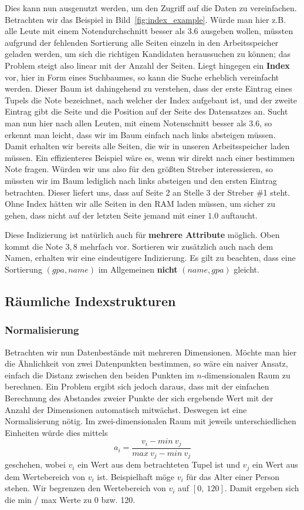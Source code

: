 Dies kann nun ausgenutzt werden, um den Zugriff auf die Daten zu vereinfachen. Betrachten
wir das Beispiel in Bild~\ref{fig:index_example}. Würde man hier z.B. alle Leute
mit einem Notendurchschnitt besser als \(3.6\) ausgeben wollen, müssten aufgrund der
fehlenden Sortierung alle Seiten einzeln in den Arbeitsspeicher geladen werden,
um sich die richtigen Kandidaten heraussuchen zu können; das Problem steigt also
linear mit der Anzahl der Seiten. Liegt hingegen ein
\textbf{Index} vor, hier in Form eines Suchbaumes, so kann die Suche erheblich
vereinfacht werden. Dieser Baum ist dahingehend zu verstehen, dass der erste
Eintrag eines Tupels die Note bezeichnet, nach welcher der Index aufgebaut ist,
und der zweite Eintrag gibt die Seite und die Position auf der Seite des Datensatzes
an. Sucht man nun hier nach allen Leuten, mit einem Notenschnitt besser als \(3.6\),
so erkennt man leicht, dass wir im Baum einfach nach links absteigen müssen. Damit
erhalten wir bereits alle Seiten, die wir in unseren Arbeitsspeicher laden müssen.
Ein effizienteres Beispiel wäre es, wenn wir direkt nach einer bestimmen Note fragen.
Würden wir uns also für den größten Streber interessieren, so müssten wir im Baum
lediglich nach links absteigen und den ersten Eintrag betrachten. Dieser liefert uns,
dass auf Seite 2 an Stelle 3 der Streber \#1 steht. Ohne Index hätten wir alle
Seiten in den RAM laden müssen, um sicher zu gehen, dass nicht auf der letzten
Seite jemand mit einer \(1.0\) auftaucht.

Diese Indizierung ist natürlich auch für \textbf{mehrere Attribute} möglich.
Oben kommt die Note \(3,8\) mehrfach vor. Sortieren wir zusätzlich auch nach dem
Namen, erhalten wir eine eindeutigere Indizierung. Es gilt zu beachten, dass
eine Sortierung \((gpa, name)\) im Allgemeinen \textbf{nicht} \((name, gpa)\)
gleicht.

\subsection{Räumliche Indexstrukturen}
\subsubsection{Normalisierung}
Betrachten wir nun Datenbestände mit mehreren Dimensionen. Möchte man hier die
Ähnlichkeit von zwei Datenpunkten bestimmen, so wäre ein naiver Ansatz, einfach
die Distanz zwischen den beiden Punkten im \(n\)-dimensionalen Raum zu berechnen.
Ein Problem ergibt sich jedoch daraus, dass mit der einfachen Berechnung des Abstandes
zweier Punkte der sich ergebende Wert mit der Anzahl der Dimensionen automatisch
mitwächst. Deswegen ist eine Normalisierung nötig. Im zwei-dimensionalen Raum mit
jeweils unterschiedlichen Einheiten würde dies mittels
\[
	a_i = \frac{v_i - min\ v_j}{max\ v_j - min\ v_j}
\]
geschehen, wobei \(v_i\) ein Wert aus dem betrachteten Tupel ist und \(v_j\)
ein Wert aus dem Wertebereich von \(v_i\) ist. Beispielhaft möge \(v_i\) für
das Alter einer Person stehen. Wir begrenzen den Wertebereich von \(v_i\) auf
\([0,\ 120]\). Damit ergeben sich die min / max Werte zu 0 bzw. 120. 

